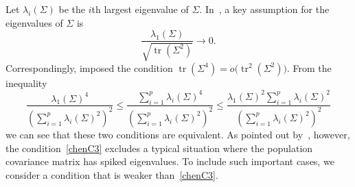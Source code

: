 \documentclass[3p]{elsarticle}
\DeclareMathOperator{\mytr}{tr}
\theoremstyle{plain}
\theoremstyle{definition}
\theoremstyle{remark}
\begin{document}

    Let $\lambda_i(\Sigma)$ be the $i$th largest eigenvalue of $\Sigma$.
In~\citet{Bai1996Efiect},
a key assumption for the eigenvalues of $\Sigma$ is
\begin{equation}\label{chenC3}
    \frac{\lambda_{1}(\Sigma)}{\sqrt{\mytr (\Sigma^2)}}\to 0.
\end{equation}
Correspondingly, \citet{Chen2010A} imposed the condition $\mytr (\Sigma^4)=o\big(\mytr ^2(\Sigma^2)\big)$.
    From the inequality
    \begin{equation*}
    \frac{\lambda_1(\Sigma)^4}{(\sum_{i=1}^p \lambda_i(\Sigma)^2)^2}
    \leq
    \frac{\sum_{i=1}^p\lambda_i(\Sigma)^4}{(\sum_{i=1}^p \lambda_i(\Sigma)^2)^2}
    \leq
    \frac{\lambda_1(\Sigma)^2\sum_{i=1}^p\lambda_i(\Sigma)^2}{(\sum_{i=1}^p \lambda_i(\Sigma)^2)^2}
    \end{equation*}
    we can see that these two conditions are equivalent.
As pointed out by~\cite{KATAYAMA2013410}, however, the condition~\eqref{chenC3} excludes a typical situation where the population covariance matrix has spiked eigenvalues.
To include such important cases, we consider a condition that is weaker than~\eqref{chenC3}.
\end{document}

